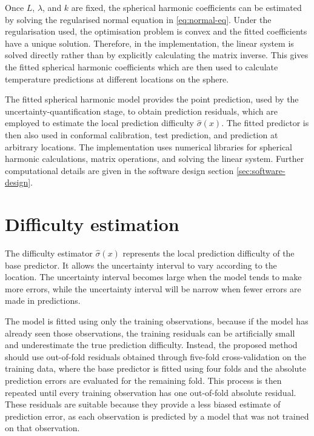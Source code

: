\documentclass[11pt,a4paper]{report}
\begin{document}
Once $L$, $\lambda$, and $k$ are fixed, the spherical harmonic coefficients can be estimated by solving the regularised normal equation in \cref{eq:normal-eq}. Under the regularisation used, the optimisation problem is convex and the fitted coefficients have a unique solution. Therefore, in the implementation, the linear system is solved directly rather than by explicitly calculating the matrix inverse.  This gives the fitted spherical harmonic coefficients which are then used to calculate temperature predictions at different locations on the sphere.

The fitted spherical harmonic model provides the point prediction, used by the uncertainty-quantification stage, to obtain prediction residuals, which are employed to estimate the local prediction difficulty $\hat{\sigma}(x)$. The fitted predictor is then also used in conformal calibration, test prediction, and prediction at arbitrary locations. The implementation uses numerical libraries for spherical harmonic calculations, matrix operations, and solving the linear system. Further computational details are given in the software design section \cref{sec:software-design}.

\section{Difficulty estimation}
 
The difficulty estimator $\hat\sigma(x)$ represents the local prediction difficulty of the base predictor. It allows the uncertainty interval to vary according to the location. The uncertainty interval becomes large when the model tends to make more errors, while the uncertainty interval will be narrow when fewer errors are made in predictions.

The model is fitted using only the training observations, because if the model has already seen those observations, the training residuals can be artificially small and underestimate the true prediction difficulty. Instead, the proposed method should use out-of-fold residuals obtained through five-fold cross-validation on the training data, where the base predictor is fitted using four folds and the absolute prediction errors are evaluated for the remaining fold. This process is then repeated until every training observation has one out-of-fold absolute residual. These residuals are suitable because they provide a less biased estimate of prediction error, as each observation is predicted by a model that was not trained on that observation. 
 
\end{document}
